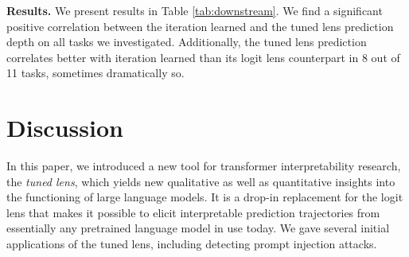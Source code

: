 \documentclass{article}
\theoremstyle{plain}
\theoremstyle{definition}
\begin{document}
\begin{table}[t]
\centering
{}
\caption{Correlation between two measures of example difficulty, the iteration learned and prediction depth, across tasks. Prediction depth is measured using the tuned lens in the first column and the logit lens in the second.}
\label{tab:downstream}
\end{table}

\textbf{Results.} We present results in Table \ref{tab:downstream}. We find a significant positive correlation between the iteration learned and the tuned lens prediction depth on all tasks we investigated. Additionally, the tuned lens prediction correlates better with iteration learned than its logit lens counterpart in 8 out of 11 tasks, sometimes dramatically so.

\section{Discussion}

In this paper, we introduced a new tool for transformer interpretability research, the \emph{tuned lens}, which yields new qualitative as well as quantitative insights into the functioning of large language models. It is a drop-in replacement for the logit lens that makes it possible to elicit interpretable prediction trajectories from essentially any pretrained language model in use today. We gave several initial applications of the tuned lens, including detecting prompt injection attacks.
\end{document}
